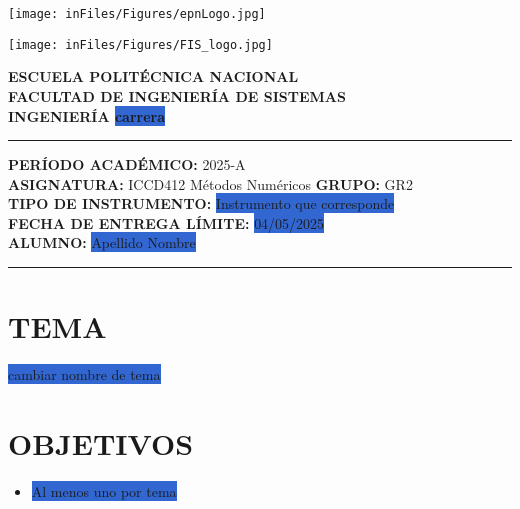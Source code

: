 \documentclass[12pt]{article}
\begin{document}
\begin{minipage}{0.45\textwidth}
    \texttt{[image: inFiles/Figures/epnLogo.jpg]}
\end{minipage}
\hfill
\begin{minipage}{0.45\textwidth}
    \raggedleft
    \texttt{[image: inFiles/Figures/FIS\_logo.jpg]}
\end{minipage}

\vspace{0.5cm}

\begin{center}
    \textbf{ESCUELA POLITÉCNICA NACIONAL}\\[0.2cm]
    \textbf{FACULTAD DE INGENIERÍA DE SISTEMAS}\\[0.2cm]
    \textbf{INGENIERÍA \colorbox{highlight}{\textbf{carrera}}}
\end{center}

\vspace{0.5cm}
\hrule
\vspace{0.5cm}

\noindent\textbf{PERÍODO ACADÉMICO:} 2025-A\\[0.2cm]
\noindent\textbf{ASIGNATURA:} ICCD412 Métodos Numéricos \hfill \textbf{GRUPO:} GR2\\[0.2cm]
\noindent\textbf{TIPO DE INSTRUMENTO:} \colorbox{highlight}{Instrumento que corresponde}\\[0.2cm]
\noindent\textbf{FECHA DE ENTREGA LÍMITE:} \colorbox{highlight}{04/05/2025}\\[0.2cm]
\noindent\textbf{ALUMNO:} \colorbox{highlight}{Apellido Nombre}

\vspace{0.5cm}
\hrule
\vspace{1cm}


\section*{TEMA}
\colorbox{highlight}{cambiar nombre de tema}

\vspace{0.5cm}

\section*{OBJETIVOS}
\begin{itemize}
    \item \colorbox{highlight}{Al menos uno por tema}
\end{itemize}
\end{document}

